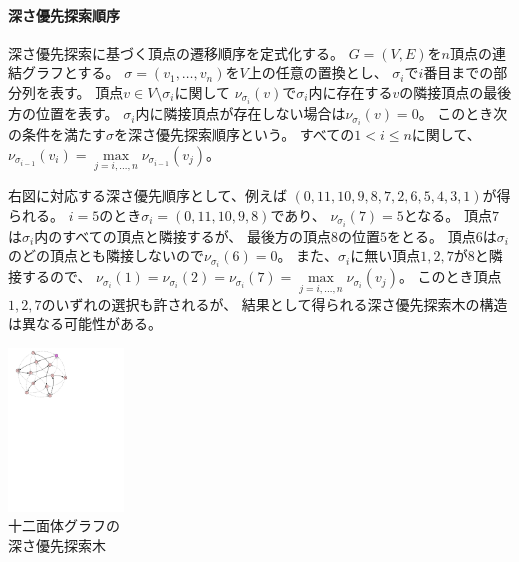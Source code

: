 \begin{paracol}{2}

\paragraph{深さ優先探索順序}
深さ優先探索に基づく頂点の遷移順序を定式化する。
$G=(V, E)$を$n$頂点の連結グラフとする。
$\sigma=(v_1, \ldots, v_n)$を$V$上の任意の置換とし、
$\sigma_i$で$i$番目までの部分列を表す。
頂点$v \in V \setminus \sigma_i$に関して
$\nu_{\sigma_i}(v)$で$\sigma_i$内に存在する$v$の隣接頂点の最後方の位置を表す。
$\sigma_i$内に隣接頂点が存在しない場合は$\nu_{\sigma_i}(v)=0$。
このとき次の条件を満たす$\sigma$を深さ優先探索順序という。
すべての$1 < i \leq n$に関して、
$\nu_{\sigma_{i-1}}(v_i) = \max\limits_{j=i,\ldots,n}\nu_{\sigma_{i-1}}(v_j)$。

右図に対応する深さ優先順序として、例えば
$(0,11,10,9,8,7,2,6,5,4,3,1)$が得られる。
$i=5$のとき$\sigma_i=(0, 11,10,9,8)$であり、
$\nu_{\sigma_i}(7)=5$となる。%
頂点$7$は$\sigma_i$内のすべての頂点と隣接するが、
最後方の頂点$8$の位置$5$をとる。
頂点$6$は$\sigma_i$のどの頂点とも隣接しないので$\nu_{\sigma_i}(6)=0$。
また、$\sigma_i$に無い頂点$1,2,7$が$8$と隣接するので、
$\nu_{\sigma_{i}}(1) = 
\nu_{\sigma_{i}}(2) = 
\nu_{\sigma_{i}}(7) = 
\max\limits_{j=i,\ldots,n}\nu_{\sigma_{i}}(v_j)$。
このとき頂点$1, 2, 7$のいずれの選択も許されるが、
結果として得られる深さ優先探索木の構造は異なる可能性がある。

\switchcolumn
\vspace*{.5\intextsep}
\centering
\includegraphics[width=0.23\textwidth]{figures/dfs_icosahedral.pdf}\\
{\small 十二面体グラフの\\深さ優先探索木}
\end{paracol}


